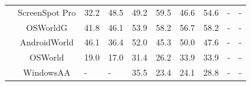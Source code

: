 {\begin{table}[htp]
\begin{adjustbox}{max width=1\textwidth}
\begin{NiceTabular}{c|c|w{c}{1cm}w{c}{1cm}|w{c}{1cm}w{c}{1cm}|w{c}{1cm}w{c}{1cm}|w{c}{1cm}w{c}{1cm}}
\midrule
{}
&ScreenSpot Pro  & 32.2 & 48.5 &  49.2 & 59.5 & 46.6 & 54.6 & - & - \\
&OSWorldG & 41.8 & 46.1 & 53.9 & 58.2 & 56.7 & 58.2 & - & - \\
&AndroidWorld & 46.1 & 36.4 & 52.0 & 45.3 & 50.0 & 47.6 & - & - \\
&OSWorld & 19.0 & 17.0 & 31.4 & 26.2 & 33.9 & 33.9 & - & - \\
&WindowsAA & - & - & 35.5 & 23.4 & 24.1 & 28.8 & - & - \\
\bottomrule
\end{NiceTabular}
\end{adjustbox}
\end{table}
}